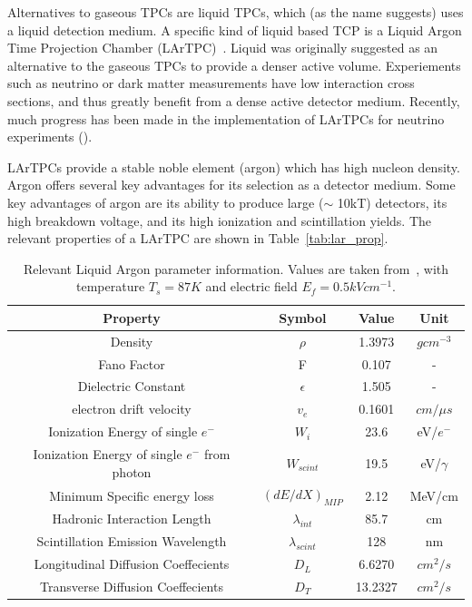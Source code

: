 Alternatives to gaseous TPCs are liquid TPCs, which (as the name suggests) uses a liquid detection medium.
A specific kind of liquid based TCP is a Liquid Argon Time Projection Chamber (LArTPC)~\citep{rubbia1977liquid}.
Liquid was originally suggested as an alternative to the gaseous TPCs to provide a denser active volume.
Experiements such as neutrino or dark matter measurements have low interaction cross sections, and thus greatly benefit from a dense active detector medium.
Recently, much progress has been made in the implementation of LArTPCs for neutrino experiments (\citep{ArgoNeuT_PhysRevD.99.012002, MicroBooNE_Acciarri_2017, LArIAT_Acciarri_2020}).

LArTPCs provide a stable noble element (argon) which has high nucleon density.
Argon offers several key advantages for its selection as a detector medium.
Some key advantages of argon are its ability to produce large ($\sim$ 10kT) detectors, its high breakdown voltage, and its high ionization and scintillation yields.
The relevant properties of a LArTPC are shown in Table~\ref{tab:lar_prop}.

\begin{table}
  \begin{center}
    \begin{tabular}{||c c c c||}
 \hline
      Property & Symbol & Value & Unit \\
 \hline\hline
      Density & $\rho$ &  1.3973 & $g cm^{-3}$ \\
      Fano Factor & F & 0.107 & - \\
      Dielectric Constant & $\epsilon$ & 1.505 & - \\
      electron drift velocity & $v_{e}$ & 0.1601 & $\unit{cm/\mu s}$ \\
      Ionization Energy of single $e^{-}$ & $W_{i}$ & 23.6 & eV/$e^{-}$ \\
      Ionization Energy of single $e^{-}$ from photon & $W_{scint}$ & 19.5 & eV/$\gamma$ \\
      Minimum Specific energy loss & $(dE/dX)_{MIP}$ & 2.12 & MeV/cm \\
      Hadronic Interaction Length & $\lambda_{int}$ &85.7 & cm \\
      Scintillation Emission Wavelength & $\lambda_{scint}$ & 128 & nm \\
      Longitudinal Diffusion Coeffecients & $D_{L}$ & 6.6270 & $cm^{2}/s$ \\
      Transverse Diffusion Coeffecients & $D_{T}$ & 13.2327 & $cm^{2}/s$ \\
 \hline
    \end{tabular}
    \caption{
      Relevant Liquid Argon parameter information.
      Values are taken from~\citep{lardata_lbnl}, with temperature $T_{s} = 87 K$ and electric field $E_{f} = 0.5 kV cm^{-1}$.}
  \end{center}
\end{table}~\label{tab:lar_prop}


